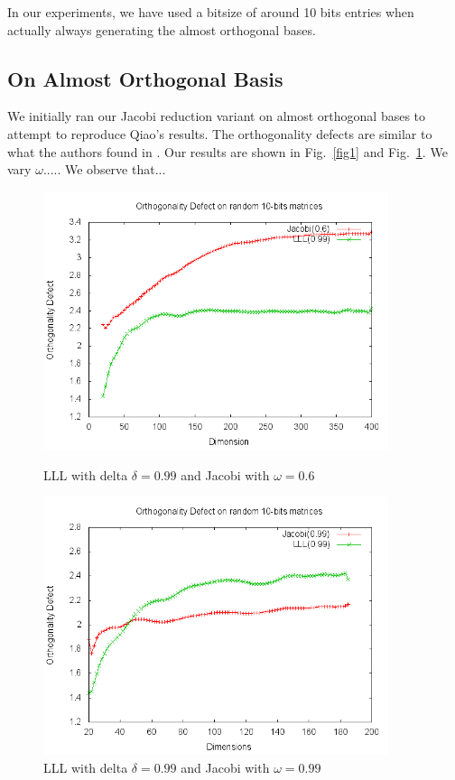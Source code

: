 \documentclass[10pt, a4paper]{article}
\newcommand{\my}[1]{{\color{blue} #1 }}
\begin{document}
In our experiments, we have used a bitsize of around 10 bits entries when \my{actually always} generating the almost orthogonal bases.

\subsection{On Almost Orthogonal Basis}

We initially ran our Jacobi reduction variant on almost orthogonal bases to attempt to reproduce Qiao's results.
The orthogonality defects are similar to \my{what} the authors found in \cite{tian2014hybrid}. \my{Our results are shown in Fig.~\ref{fig1} and Fig.~\ref{fig2}. We vary $\omega$..... We observe that...}

\begin{figure}[H]
\begin{minipage}{.5\textwidth}

  \centering
    \includegraphics[width=0.9\textwidth]{random-matrix-omega-06defect.png}
      \caption{LLL with delta $\delta = 0.99$ and Jacobi with $\omega = 0.6$}
  \label{fig1}
\end{minipage}
\begin{minipage}{.5\textwidth}

  \centering
    \includegraphics[width=0.9\textwidth]{random-matrix-omega-09defect.png}
    
  \caption{LLL with delta $\delta = 0.99$ and Jacobi with $\omega = 0.99$}
  \label{fig2}
\end{minipage}

\end{figure}
\end{document}
